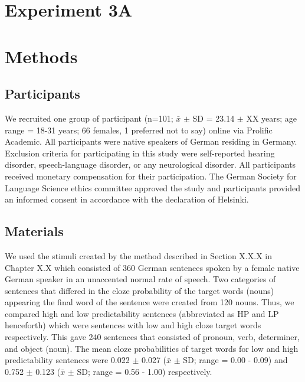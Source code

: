 \documentclass[a4paper, nobind]{templates/ociamthesis}
\begin{document}
\hypertarget{experiment-3a}{%
\section{Experiment 3A}\label{experiment-3a}}

\hypertarget{methods-3}{%
\section{Methods}\label{methods-3}}

\hypertarget{participants-2}{%
\subsection{Participants}\label{participants-2}}

We recruited one group of participant (n=101; \(\bar{x}\) \(\pm\) SD = 23.14 \(\pm\) XX years; age range = 18-31 years; 66 females, 1 preferred not to say) online via Prolific Academic.
All participants were native speakers of German residing in Germany.
Exclusion criteria for participating in this study were self-reported hearing disorder, speech-language disorder, or any neurological disorder.
All participants received monetary compensation for their participation.
The German Society for Language Science ethics committee approved the study and participants provided an informed consent in accordance with the declaration of Helsinki.

\hypertarget{materials-1}{%
\subsection{Materials}\label{materials-1}}

We used the stimuli created by the method described in Section X.X.X in Chapter X.X which consisted of 360 German sentences spoken by a female native German speaker in an unaccented normal rate of speech.
Two categories of sentences that differed in the cloze probability of the target words (nouns) appearing the final word of the sentence were created from 120 nouns.
Thus, we compared high and low predictability sentences (abbreviated as HP and LP henceforth) which were sentences with low and high cloze target words respectively.
This gave 240 sentences that consisted of pronoun, verb, determiner, and object (noun).
The mean cloze probabilities of target words for low and high predictability sentences were 0.022 \(\pm\) 0.027 (\(\bar{x}\) \(\pm\) SD; range = 0.00 - 0.09) and 0.752 \(\pm\) 0.123 (\(\bar{x}\) \(\pm\) SD; range = 0.56 - 1.00) respectively.
\end{document}
